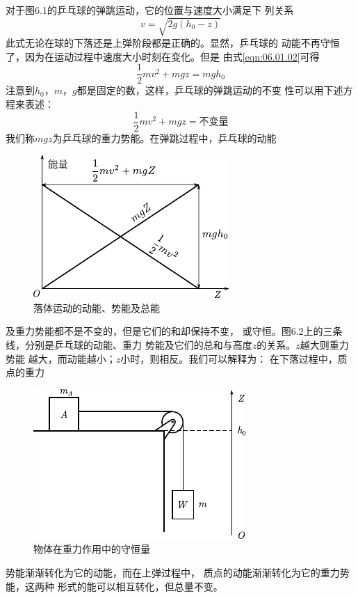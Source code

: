 对于图6.1的乒乓球的弹跳运动，它的位置与速度大小满足下
列关系
\begin{equation}\label{eqn:06.01.02}
 v = \sqrt { 2 g \left( h _ { 0 } - z \right) }
\end{equation}
此式无论在球的下落还是上弹阶段都是正确的。显然，乒乓球的
动能不再守恒了，因为在运动过程中速度大小时刻在变化。但是
由式\eqref{eqn:06.01.02}可得
\begin{equation}\label{eqn:06.01.03}
 \frac { 1 } { 2 } m v ^ { 2 } + m g z = m g h _ { 0 }
\end{equation}
注意到$ h _ { 0 } $，$ m $，$ g $都是固定的数，这样，乒乓球的弹跳运动的不变
性可以用下述方程来表述：
\begin{equation}\label{eqn:06.01.04}
 \frac { 1 } { 2 } m v ^ { 2 } + m g z = \text{不变量}
\end{equation}
我们称$ mgz $为乒乓球的重力势能。在弹跳过程中，乒乓球的动能
\begin{figure}
 \centering
 \includegraphics{figure/fig06.02}\vspace{0.6em}
 \caption{落体运动的动能、势能及总能}
 \label{fig:06.02}
\end{figure}
及重力势能都不是不变的，但是它们的和却保持不变，
或守恒。图6.2上的三条线，分别是乒乓球的动能、重力
势能及它们的总和与高度$ z $的关系。$ z $越大则重力势能
越大，而动能越小；$ z $小时，则相反。我们可以解释为：
在下落过程中，质点的重力
\clearpage
\begin{figure}
 \vspace{1em}
 \centering
 \includegraphics{figure/fig06.03}\vspace{1em}
 \caption{物体在重力作用中的守恒量}
 \label{fig:06.03}
\end{figure}
\noindent 势能渐渐转化为它的动能，而在上弹过程中，
质点的动能渐渐转化为它的重力势能，这两种
形式的能可以相互转化，但总量不变。

